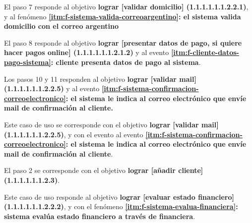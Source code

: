 El paso 7 responde al objetivo \textbf{lograr [validar domicilio]
(1.1.1.1.1.1.2.2.1)}, y al fenómeno 
\textbf{\ref{itm:f-sistema-valida-correoargentino}: el sistema valida domicilio 
con el correo argentino}

El paso 8 responde al objetivo \textbf{lograr [presentar datos de pago, si 
quiere hacer pagos online] (1.1.1.1.1.1.2.1.2)} y al evento 
\textbf{\ref{itm:f-cliente-datos-pago-sistema}: cliente presenta datos de pago 
al sistema}.

Los pasos 10 y 11 responden al objetivo \textbf{lograr [validar mail] 
(1.1.1.1.1.1.2.2.5)} y al evento 
\textbf{\ref{itm:f-sistema-confirmacion-correoelectronico}: el sistema le 
indica al correo electrónico que envíe mail de confirmación al cliente.}

%
%
\begin{casodeuso}
\end{casodeuso}

Este caso de uso se corresponde con el objetivo 
\textbf{lograr [validar mail] (1.1.1.1.1.1.2.2.5)}, y con el evento al evento 
\textbf{\ref{itm:f-sistema-confirmacion-correoelectronico}: el sistema le 
indica al correo electrónico que envíe mail de confirmación al cliente}.

El paso 2 se corresponde con el objetivo 
\textbf{lograr [añadir cliente] (1.1.1.1.1.1.2.3)}.

%
%
\begin{casodeuso}
  \cupre{}
  \cupost{}
\end{casodeuso}

Este caso de uso responde al objetivo \textbf{lograr 
[evaluar estado financiero] (1.1.1.1.1.1.2.2.2)}, y con el fenómeno 
\textbf{\ref{itm:f-sistema-evalua-financiera}: sistema evalúa estado 
financiero a través de financiera}.

